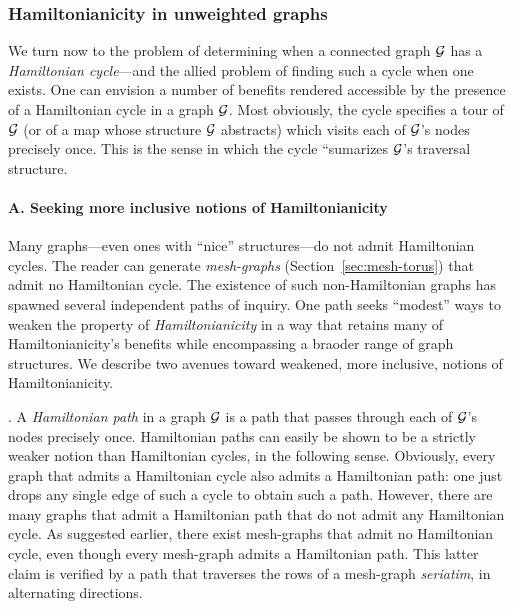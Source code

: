\subsubsection{Hamiltonianicity in unweighted graphs}
\label{sec:Hamiltonian-unweighted}

We turn now to the problem of determining when a connected graph $\mbox{$\cal G$}$
has a {\it Hamiltonian cycle}---and the allied problem of finding such
a cycle when one exists.  One can envision a number of benefits
rendered accessible by the presence of a Hamiltonian cycle in a graph
$\mbox{$\cal G$}$.  Most obviously, the cycle specifies a tour of $\mbox{$\cal G$}$ (or of a map
whose structure $\mbox{$\cal G$}$ abstracts) which visits each of $\mbox{$\cal G$}$'s nodes
precisely once.  This is the sense in which the cycle ``sumarizes
$\mbox{$\cal G$}$'s traversal structure.

\paragraph{\small\sf A. Seeking more inclusive notions of Hamiltonianicity}

Many graphs---even ones with ``nice'' structures---do not admit
Hamiltonian cycles.  The reader can generate {\it mesh-graphs}
(Section~\ref{sec:mesh-torus}) that admit no Hamiltonian cycle.  The
existence of such non-Hamiltonian graphs has spawned several
independent paths of inquiry.  One path seeks ``modest'' ways to
weaken the property of {\it Hamiltonianicity}
 in a way that retains many of
Hamiltonianicity's benefits while encompassing a braoder range of
graph structures.  We describe two avenues toward weakened, more
inclusive, notions of Hamiltonianicity.

.
A {\it Hamiltonian path} 
 in a graph $\mbox{$\cal G$}$ is a path that passes through
each of $\mbox{$\cal G$}$'s nodes precisely once.  Hamiltonian paths can easily be
shown to be a strictly weaker notion than Hamiltonian cycles, in the
following sense.  Obviously, every graph that admits a Hamiltonian
cycle also admits a Hamiltonian path: one just drops any single edge
of such a cycle to obtain such a path.  However, there are many graphs
that admit a Hamiltonian path that do not admit any Hamiltonian cycle.
As suggested earlier, there exist mesh-graphs that admit no
Hamiltonian cycle, even though every mesh-graph admits a Hamiltonian
path.  This latter claim is verified by a path that traverses the rows
of a mesh-graph {\it seriatim}, in alternating directions.


